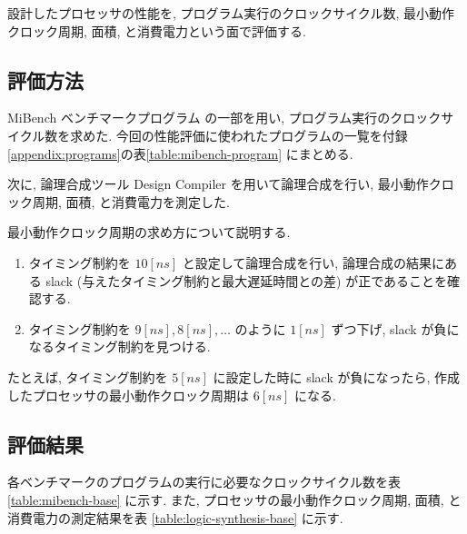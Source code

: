 \documentclass[../main.tex]{subfiles}
\begin{document}
  設計したプロセッサの性能を, プログラム実行のクロックサイクル数, 
  最小動作クロック周期, 面積, と消費電力という面で評価する.

  \subsection{評価方法}
  MiBench ベンチマークプログラム \cite{mibench} の一部を用い, プログラム実行のクロックサイクル数を求めた.
  今回の性能評価に使われたプログラムの一覧を付録\ref{appendix:programs}の表\ref{table:mibench-program} にまとめる.

  次に, 論理合成ツール Design Compiler を用いて論理合成を行い, 
  最小動作クロック周期, 面積, と消費電力を測定した.

  最小動作クロック周期の求め方について説明する.
  \begin{enumerate}
    \item タイミング制約を $10[ns]$ と設定して論理合成を行い, 
    論理合成の結果にある slack (与えたタイミング制約と最大遅延時間との差) が正であることを確認する.
    \item タイミング制約を $9[ns], 8[ns], \ldots$ のように $1[ns]$ ずつ下げ, 
    slack が負になるタイミング制約を見つける.
  \end{enumerate}

  たとえば, タイミング制約を $5[ns]$ に設定した時に slack が負になったら, 
  作成したプロセッサの最小動作クロック周期は $6[ns]$ になる.

  \subsection{評価結果}
  各ベンチマークのプログラムの実行に必要なクロックサイクル数を表 \ref{table:mibench-base} に示す.
  また, プロセッサの最小動作クロック周期, 面積, と消費電力の測定結果を表 \ref{table:logic-synthesis-base} に示す.

  \begin{table}[tbh]
    \centering
    \caption{ベンチマークプログラムの実行クロックサイクル数(改善前)}
    \label{table:mibench-base}
  \end{table}

  \begin{table}[tbh]
    \centering
    \caption{論理合成の結果(改善前)}
    \label{table:logic-synthesis-base}
  \end{table}
\end{document}
